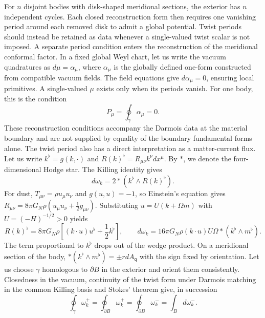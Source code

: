 \documentclass[amsmath,amsfonts,amssymb,aps,pra,superscriptaddress,10pt]{revtex4-2}
\numberwithin{equation}{section}
\theoremstyle{plain}
\theoremstyle{definition}
\theoremstyle{remark}
\theoremstyle{definition}
\begin{document}
For $n$ disjoint bodies with disk-shaped meridional sections, the exterior has $n$ independent cycles. Each closed reconstruction form then requires one vanishing period around each removed disk to admit a global potential. Twist periods should instead be retained as data whenever a single-valued twist scalar is not imposed. A separate period condition enters the reconstruction of the meridional conformal factor. In a fixed global Weyl chart, let us write the vacuum quadratures as $d\mu=\alpha_\mu$, where $\alpha_\mu$ is the globally defined one-form constructed from compatible vacuum fields. The field equations give $d\alpha_\mu=0$, ensuring local primitives. A single-valued $\mu$ exists only when its periods vanish. For one body, this is the condition
\begin{equation}
P_\mu=\oint_\gamma\alpha_\mu=0.
\end{equation}
These reconstruction conditions accompany the Darmois data at the material boundary and are not supplied by equality of the boundary fundamental forms alone. The twist period also has a direct interpretation as a matter-current flux. Let us write $k^\flat=g(k,\cdot)$ and $R(k)^\flat=R_{\mu\nu}k^\nu dx^\mu$. By $*$, we  denote the four-dimensional Hodge star. The Killing identity gives \cite{Wald1984GR}
\begin{equation}
d\omega_k=2*\left(k^\flat\wedge R(k)^\flat\right).
\end{equation}
For dust, $T_{\mu\nu}=\rho u_\mu u_\nu$ and $g(u,u)=-1$, so Einstein's equation gives $R_{\mu\nu}=8\pi G_N\rho(u_\mu u_\nu+\frac{1}{2}g_{\mu\nu})$. Substituting $u=U(k+\Omega m)$ with $U=(-H)^{-1/2}>0$  yields
\begin{equation}
R(k)^\flat=8\pi G_N\rho\left[(k\cdot u)u^\flat+\frac{1}{2}k^\flat\right],\qquad
d\omega_k=16\pi G_N\rho(k\cdot u)U\Omega
*\left(k^\flat\wedge m^\flat\right).
\end{equation}
The term proportional to $k^\flat$ drops out of the wedge product. On a meridional section of the body, $*\left(k^\flat\wedge m^\flat\right)=\pm rdA_{\mathsf{q}}$ with the sign fixed by orientation. Let us choose $\gamma$ homologous to $\partial B$ in the exterior and orient them consistently. Closedness in the vacuum, continuity of the twist form under Darmois matching in the common Killing basis and Stokes' theorem give, in succession
\begin{equation}
\oint_\gamma\omega_k^+=\oint_{\partial B}\omega_k^+=\oint_{\partial B}\omega_k^-=\int_B d\omega_k^-.
\end{equation}
\end{document}

